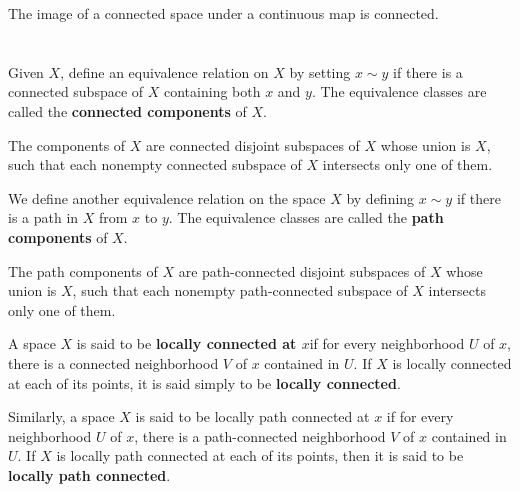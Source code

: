 \documentclass[12pt, a4paper, oneside]{book}
\begin{document}
\begin{theorem}
    The image of a connected space under a continuous map is connected.
\end{theorem}


\section{}
\begin{lemma}
    Given $X$, define an equivalence relation on $X$ by setting $x \sim y$ if there is a connected subspace of $X$ containing both $x$ and $y$. The equivalence classes are called the \textbf{connected components} of $X$.
\end{lemma}

\begin{theorem}
    The components of $X$ are connected disjoint subspaces of $X$ whose union is $X$, such that each nonempty connected subspace of $X$ intersects only one of them.
\end{theorem}

\begin{definition}
    We define another equivalence relation on the space $X$ by defining $x \sim y$ if there is a path in $X$ from $x$ to $y$. The equivalence classes are called the \textbf{path components} of $X$.
\end{definition}

\begin{theorem}
    The path components of $X$ are path-connected disjoint subspaces of $X$ whose union is $X$, such that each nonempty path-connected subspace of $X$ intersects only one of them.
\end{theorem}



\begin{definition}
    A space $X$ is said to be \textbf{locally connected at $x$}if for every neighborhood $U$ of $x$, there is a connected neighborhood $V$ of $x$ contained in $U$.
    If $X$ is locally connected at each of its points, it is said simply to be \textbf{locally connected}.

    Similarly, a space $X$ is said to be locally path connected at $x$ if for every neighborhood $U$ of $x$, there is a path-connected neighborhood $V$ of $x$ contained in $U$. If $X$ is locally path connected at each of its points, then it is said to be \textbf{locally path connected}.
\end{definition}
\end{document}
